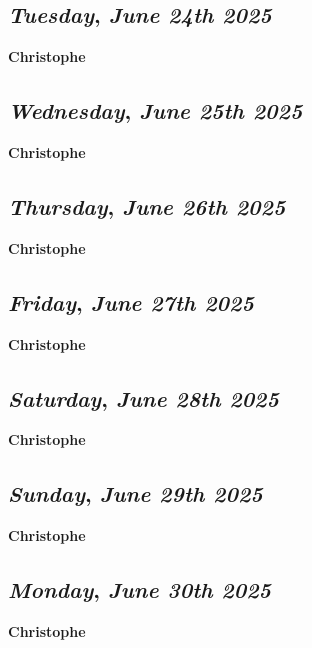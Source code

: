 \def\day{\textit{June 24th 2025}}
\def\weekday{\textit{Tuesday}}
\subsection*{\weekday, \day}
\textbf {Christophe}

\def\day{\textit{June 25th 2025}}
\def\weekday{\textit{Wednesday}}
\subsection*{\weekday, \day}
\textbf {Christophe}

\def\day{\textit{June 26th 2025}}
\def\weekday{\textit{Thursday}}
\subsection*{\weekday, \day}
\textbf {Christophe}

\def\day{\textit{June 27th 2025}}
\def\weekday{\textit{Friday}}
\subsection*{\weekday, \day}
\textbf {Christophe}

\def\day{\textit{June 28th 2025}}
\def\weekday{\textit{Saturday}}
\subsection*{\weekday, \day}
\textbf {Christophe}

\def\day{\textit{June 29th 2025}}
\def\weekday{\textit{Sunday}}
\subsection*{\weekday, \day}
\textbf {Christophe}

\def\day{\textit{June 30th 2025}}
\def\weekday{\textit{Monday}}
\subsection*{\weekday, \day}
\textbf {Christophe}
